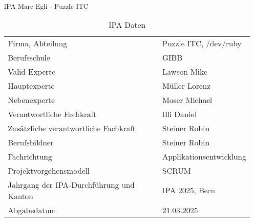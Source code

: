 \begin{titlepage}
  \Huge IPA Marc Egli - Puzzle ITC \normalsize
\bigbreak
\begin{table}[h!]
    \begin{tabular}{|L{0.4\textwidth}|L{0.5\textwidth}|}
        \hline
          \\[12pt]
        \hline
        Firma, Abteilung & Puzzle ITC, /dev/ruby \\
        \hline
        Berufsschule & GIBB \\
        \hline
        Valid Experte & Lawson Mike \\ 
        \hline
        Hauptexperte & Müller Lorenz \\
        \hline
        Nebenexperte & Moser Michael \\
        \hline
        Verantwortliche Fachkraft & Illi Daniel \\
        \hline
        Zusätzliche verantwortliche Fachkraft & Steiner Robin \\
        \hline
        Berufsbildner & Steiner Robin \\
        \hline
        Fachrichtung & Applikationsentwicklung \\
        \hline
        Projektvorgehensmodell & SCRUM \\
        \hline
        Jahrgang der IPA-Durchführung und Kanton &  IPA 2025, Bern \\
        \hline
        Abgabedatum & 21.03.2025 \\
        \hline
      \end{tabular}
      \caption{IPA Daten}
\end{table}
\end{titlepage}
